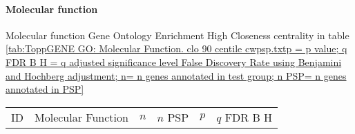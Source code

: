 \paragraph{Molecular function}

Molecular function Gene Ontology Enrichment High Closeness centrality in table \ref{tab:ToppGENE GO: Molecular Function. clo 90 centile cwpsp.txtp = p value; q FDR B H = q adjusted significance level False Discovery Rate using Benjamini and Hochberg adjustment; n= n genes annotated in test group; n PSP= n genes annotated in PSP}


  \begin{table}[ht]
\centering
\begin{adjustbox}{width=\textwidth}
\setlength{\extrarowheight}{2pt}
\begin{tabular}{@{}clllcl@{}}
  \toprule
  ID & Molecular Function & $n$ & $n$ PSP & $p$ & $q$ FDR B H \\ 


\end{tabular}
\end{adjustbox}
\end{table}

